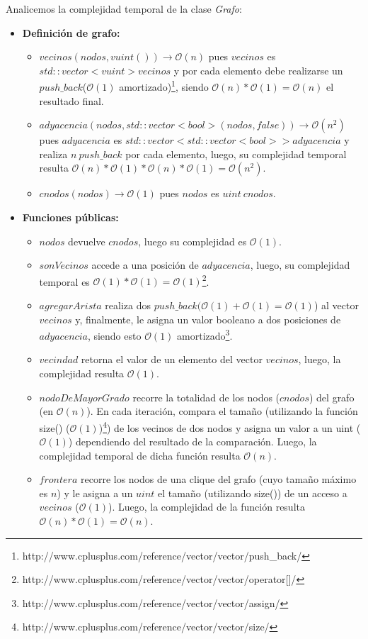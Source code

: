 \documentclass[10pt, a4paper]{article}
\begin{document}
\begin{itemize}
Analicemos la complejidad temporal de la clase \textit{Grafo}:
\begin{itemize}
\item \textbf{Definición de grafo:}
\begin{itemize}
\item $vecinos(nodos, vuint()) \rightarrow \mathcal{O}(n)$ pues $vecinos$ es $std::vector< vuint > vecinos$ y por cada elemento debe realizarse un $push\_back$($\mathcal{O}(1)$ amortizado)\footnote{http://www.cplusplus.com/reference/vector/vector/push\_back/}, siendo $\mathcal{O}(n)*\mathcal{O}(1) = \mathcal{O}(n)$ el resultado final.
\item $adyacencia(nodos, std::vector<bool>(nodos, false)) \rightarrow \mathcal{O}(n^2)$ pues $adyacencia$ es $std::vector<std::vector<bool> > adyacencia$ y realiza $n\ push\_back$ por cada elemento, luego, su complejidad temporal resulta $\mathcal{O}(n)*\mathcal{O}(1)*\mathcal{O}(n)*\mathcal{O}(1) = \mathcal{O}(n^2)$.
\item $cnodos(nodos) \rightarrow \mathcal{O}(1)$ pues $nodos$ es $uint\ cnodos$.
\end{itemize}
\item \textbf{Funciones públicas:}
\begin{itemize}
\item $nodos$ devuelve $cnodos$, luego su complejidad es $\mathcal{O}(1)$.
\item $sonVecinos$ accede a una posición de $adyacencia$, luego, su complejidad temporal es $\mathcal{O}(1)*\mathcal{O}(1) = \mathcal{O}(1)$\footnote{http://www.cplusplus.com/reference/vector/vector/operator[]/}.
\item $agregarArista$ realiza dos $push\_back (\mathcal{O}(1) + \mathcal{O}(1) = \mathcal{O}(1)$) al vector $vecinos$ y, finalmente, le asigna un valor booleano a dos posiciones de $adyacencia$, siendo esto $\mathcal{O}(1)$ amortizado\footnote{http://www.cplusplus.com/reference/vector/vector/assign/}.
\item $vecindad$ retorna el valor de un elemento del vector $vecinos$, luego, la complejidad resulta $\mathcal{O}(1)$.
\item $nodoDeMayorGrado$ recorre la totalidad de los nodos ($cnodos$) del grafo (en $\mathcal{O}(n)$). En cada iteración, compara el tamaño (utilizando la función size() ($\mathcal{O}(1)$)\footnote{http://www.cplusplus.com/reference/vector/vector/size/}) de los vecinos de dos nodos y asigna un valor a un uint ($\mathcal{O}(1)$) dependiendo del resultado de la comparación. Luego, la complejidad temporal de dicha función resulta $\mathcal{O}(n)$.
\item $frontera$ recorre los nodos de una clique del grafo (cuyo tamaño máximo es $n$) y le asigna a un $uint$ el tamaño (utilizando size()) de un acceso a $vecinos$ ($\mathcal{O}(1)$). Luego, la complejidad de la función resulta $\mathcal{O}(n)*\mathcal{O}(1) = \mathcal{O}(n)$.
\end{itemize}
\end{itemize}


\end{itemize}
\end{document}
